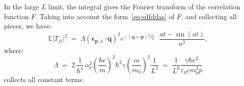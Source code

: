 \documentclass[12pt,onecolumn,amssymb,nofootinbib]{revtex4-2} %
\newcommand*{\boldvec}[1]{\ensuremath{\boldsymbol{#1}}}%
\let\vec\boldvec%
\begin{document}
In the large $L$ limit, the integral gives the Fourier transform of the correlation function $F$. Taking into account the form~\eqref{eq:sdfddas} of $F$, and collecting all pieces, we have:
\begin{equation}\label{eq:result1}
\mathbb{E} |T_{fi} |^{2} \; = \; \Lambda
(\vec{\epsilon}_{\mathbf{p},\lambda} \cdot
\mathbf{q})^{2}e^{-\mathbf{\left(q+p\right)}^{2}r_{C}^{2}}\;\;
\frac{at - \sin(at)}{a^3},
\end{equation}
where:
\begin{equation}\label{eq:gamma}
\Lambda \; = \;
2\, \frac{1}{\hbar^{4}}\,\alpha_{p}^{2}\left(\frac{\hbar
e}{m}\right)^{2} \hbar^{2} \gamma \left(\frac{m}{m_{0}}\right)^{2} \frac{1}{L^{3}} \; = \; \frac{1}{L^6} \frac{\gamma\hbar
e^{2}}{\varepsilon_{0}cm_{0}^{2}p}
\end{equation}
collects all constant terms.
\end{document}
